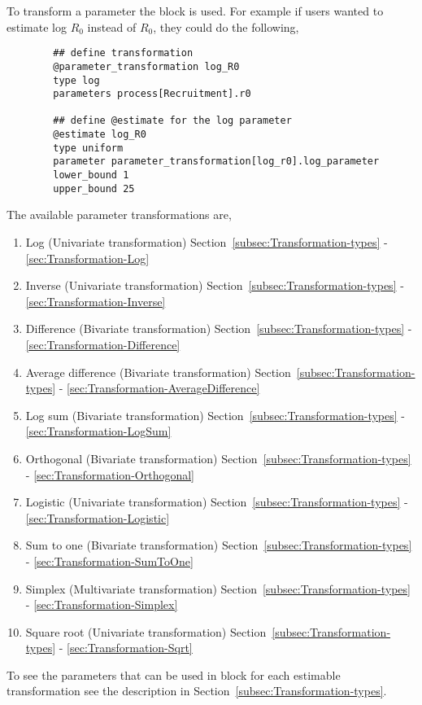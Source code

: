 To transform a parameter the  block is used. For example if users wanted to estimate log \(R_0\) instead of \(R_0\), they could do the following,
{\small{\begin{verbatim}
		## define transformation
		@parameter_transformation log_R0
		type log
		parameters process[Recruitment].r0

		## define @estimate for the log parameter
		@estimate log_R0
		type uniform
		parameter parameter_transformation[log_r0].log_parameter
		lower_bound 1
		upper_bound 25
\end{verbatim}}}
%
The available parameter transformations are,
\begin{enumerate}
	\item Log (Univariate transformation) Section~\ref{subsec:Transformation-types} - \ref{sec:Transformation-Log}
	\item Inverse (Univariate transformation) Section~\ref{subsec:Transformation-types} - \ref{sec:Transformation-Inverse}
	\item Difference (Bivariate transformation) Section~\ref{subsec:Transformation-types} - \ref{sec:Transformation-Difference}
	\item Average difference (Bivariate transformation) Section~\ref{subsec:Transformation-types} - \ref{sec:Transformation-AverageDifference}
	\item Log sum (Bivariate transformation) Section~\ref{subsec:Transformation-types} - \ref{sec:Transformation-LogSum}	
	\item Orthogonal (Bivariate transformation) Section~\ref{subsec:Transformation-types} - \ref{sec:Transformation-Orthogonal}
	\item Logistic (Univariate transformation) Section~\ref{subsec:Transformation-types} - \ref{sec:Transformation-Logistic}
	\item Sum to one (Bivariate transformation) Section~\ref{subsec:Transformation-types} - \ref{sec:Transformation-SumToOne}
	\item Simplex (Multivariate transformation) Section~\ref{subsec:Transformation-types} - \ref{sec:Transformation-Simplex}	
	\item Square root (Univariate transformation) Section~\ref{subsec:Transformation-types} - \ref{sec:Transformation-Sqrt}	
\end{enumerate}

To see the parameters that can be used in  block for each estimable transformation see the  description in Section~\ref{subsec:Transformation-types}.

